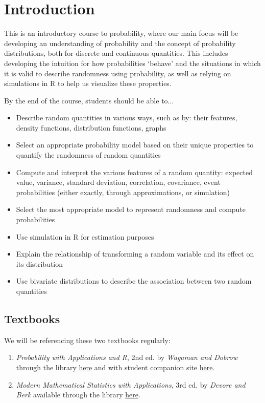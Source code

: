 \chapter*{Introduction} 

This is an introductory course to probability, where our main focus will be developing an understanding of probability and the concept of probability distributions, both for discrete and continuous quantities. This includes developing the intuition for how probabilities `behave' and the situations in which it is valid to describe randomness using probability, as well as relying on simulations in R to help us visualize these properties.

By the end of the course, students should be able to...

\begin{itemize}
    \item Describe random quantities in various ways, such as by: their features, density functions, distribution functions, graphs
    \item Select an appropriate probability model based on their unique properties to quantify the randomness of random quantities
    \item Compute and interpret the various features of a random quantity: expected value, variance, standard deviation, correlation, covariance, event probabilities (either exactly, through approximations, or simulation)
    \item Select the most appropriate model to represent randomness and compute probabilities
    \item Use simulation in R for estimation purposes
    \item Explain the relationship of transforming a random variable and its effect on its distribution
    \item Use bivariate distributions to describe the association between two random quantities
\end{itemize}

\section*{Textbooks} 

We will be referencing these two textbooks regularly:

\begin{enumerate}
    \item \textit{Probability with Applications and R}, 2nd ed. by \textit{Wagaman and Dobrow} through the library \href{https://books-scholarsportal-info.myaccess.library.utoronto.ca/en/read?id=/ebooks/ebooks6/wiley6/2021-06-14/1/9781119692430#page=2}{here} and with student companion site \href{https://bcs.wiley.com/he-bcs/Books?action=index&itemId=1119692385&bcsId=12094}{here}.
    \item \textit{Modern Mathematical Statistics with Applications}, 3rd ed. by \textit{Devore and Berk} available through the library \href{https://login.library.utoronto.ca/index.php?url=https://link.springer.com/10.1007/978-3-030-55156-8}{here}.
\end{enumerate}

